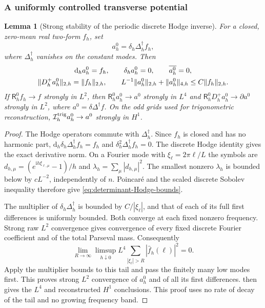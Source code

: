 \documentclass[11pt]{article}
\numberwithin{equation}{section}
\newtheorem{lemma}[lemma]{Lemma}
\theoremstyle{definition}
\theoremstyle{remark}
\newcommand{\dd}{\mathrm d}
\newcommand{\ii}{\mathrm i}
\newcommand{\norm}[1]{\lVert#1\rVert}
\begin{document}
\subsubsection{A uniformly controlled transverse potential}

\begin{lemma}[Strong stability of the periodic discrete Hodge inverse]
\label{lem:determinant-Hodge-stability}
For a closed, zero-mean real two-form $f_h$, set
\begin{equation}
 a_h^0=\delta_h\Delta_h^\dagger f_h,
 \label{eq:determinant-Hodge-primitive}
\end{equation}
where $\Delta_h^\dagger$ vanishes on the constant modes.  Then
\begin{gather}
 \dd_h a_h^0=f_h,\qquad \delta_h a_h^0=0,\qquad
 \overline{a_h^0}=0,\notag\\
 \norm{D_h^+a_h^0}_{2,h}=\norm{f_h}_{2,h},\qquad
 L^{-1}\norm{a_h^0}_{2,h}+\norm{a_h^0}_{4,h}
       \le C\norm{f_h}_{2,h}.
 \label{eq:determinant-Hodge-bounds}
\end{gather}
If $\mathsf R_h^0f_h\to f$ strongly in $L^2$, then
$\mathsf R_h^0a_h^0\to a^0$ strongly in $L^4$ and
$\mathsf R_h^0D_h^+a_h^0\to\partial a^0$ strongly in $L^2$, where
$a^0=\delta\Delta^\dagger f$.  On the odd grids used for trigonometric
reconstruction, $\mathcal I_h^{\rm trig}a_h^0\to a^0$ strongly in $H^1$.
\end{lemma}
\begin{proof}
The Hodge operators commute with $\Delta_h^\dagger$.  Since $f_h$ is
closed and has no harmonic part,
$\dd_h\delta_h\Delta_h^\dagger f_h=f_h$ and
$\delta_h^2\Delta_h^\dagger f_h=0$.  The discrete Hodge identity gives
the exact derivative norm.  On a Fourier mode with
$\xi_\ell=2\pi\ell/L$ the symbols are
$d_{h,\mu}=(e^{\ii h\xi_{\ell,\mu}}-1)/h$ and
$\lambda_h=\sum_\mu|d_{h,\mu}|^2$.
The smallest nonzero $\lambda_h$ is bounded below by $cL^{-2}$,
independently of $n$.  Poincar\'e and the scaled discrete Sobolev inequality
therefore give \eqref{eq:determinant-Hodge-bounds}.

The multiplier of $\delta_h\Delta_h^\dagger$ is bounded by
$C/|\xi_\ell|$, and that of each of its full first differences is uniformly
bounded.  Both converge at each fixed nonzero frequency.  Strong raw
$L^2$ convergence gives convergence of every fixed discrete Fourier
coefficient and of the total Parseval mass.  Consequently
\[
 \lim_{R\to\infty}\limsup_{h\downarrow0}
    L^4\sum_{|\xi_\ell|>R}|\widehat f_h(\ell)|^2=0.
\]
Apply the multiplier bounds to this tail and pass the finitely many low
modes first.  This proves strong $L^2$ convergence of $a_h^0$ and of all
its first differences.  
then gives the $L^4$ and reconstructed $H^1$ conclusions.  This proof uses
no rate of decay of the tail and no growing frequency band.
\end{proof}
\end{document}
